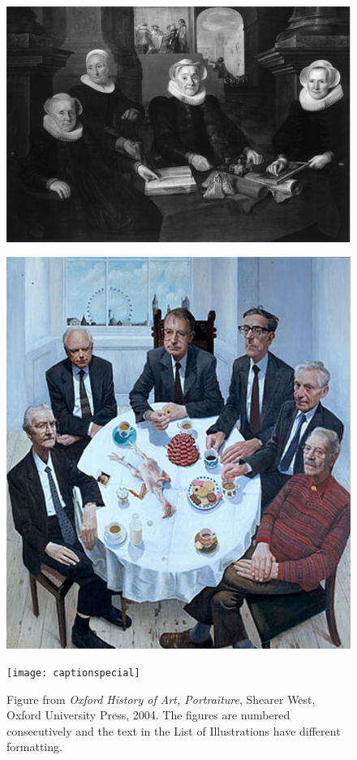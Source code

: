 \def\doubletakeimage{%
  \renewcommand{\topfraction}{.95}  %
  \begin{figure}[t]
    \thispagestyle{caption}
    \includegraphics[width=\textwidth]{matron}%
  \end{figure}

  \begin{figure}[tp]
   \hspace*{-\marginparwidth}\includegraphics[height=0.9\textheight]{stuartpearson}
 \end{figure}
}


\doubletakeimage
\lipsum[1-4]
\begin{figure}[htp]
\texttt{[image: captionspecial]}
\centering
\caption{Figure from \textit{Oxford History of Art, Portraiture}, Shearer West, Oxford University Press, 2004. The figures are numbered consecutively and the text in the List of Illustrations have different formatting.}
\end{figure}
\restoregeometry
\addtocounter{chapter}{-2}
\@toctrue\@specialtrue
